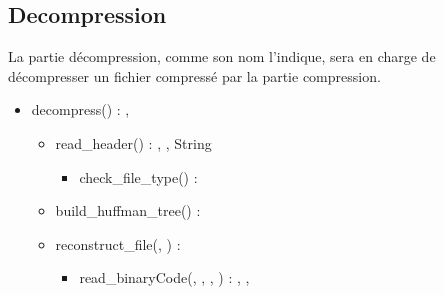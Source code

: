 \subsection{Decompression}

La partie décompression, comme son nom l'indique, sera en charge de décompresser un fichier compressé par la partie compression.

\begin{itemize}
    \item decompress(\binaryFile) : \binaryFile, \booleen
    \begin{itemize}
        \item read\_header(\binaryFile) : \statistics, \naturel, String
        \begin{itemize}
            \item check\_file\_type(\binaryFile) : \booleen
        \end{itemize}
        \item build\_huffman\_tree(\statistics) : \huffmanTree
        \item reconstruct\_file(\binaryFile, \huffmanTree) : \binaryFile
        \begin{itemize}
            \item read\_binaryCode(\binaryFile, \naturel, \byte, \huffmanTree) : \byte, \byte, \naturel
        \end{itemize}
    \end{itemize}
\end{itemize}
